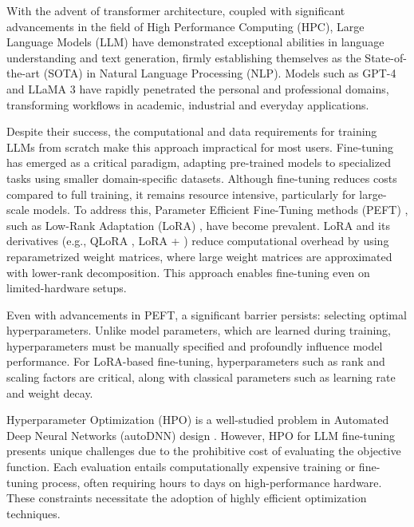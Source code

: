 \documentclass[runningheads]{llncs}
\begin{document}
With the advent of transformer architecture\cite{vaswani_attention_2017}, coupled with significant advancements in the field of High Performance Computing (HPC), Large Language Models (LLM) have demonstrated exceptional abilities in language understanding and text generation, firmly establishing themselves as the State-of-the-art (SOTA) in Natural Language Processing (NLP). Models such as GPT-4 \cite{openai_gpt-4_2024} and LLaMA 3 \cite{grattafiori_llama_2024} have rapidly penetrated the personal and professional domains, transforming workflows in academic, industrial and everyday applications.

Despite their success, the computational and data requirements for training LLMs from scratch make this approach impractical for most users. Fine-tuning has emerged as a critical paradigm, adapting pre-trained models to specialized tasks using smaller domain-specific datasets. Although fine-tuning reduces costs compared to full training, it remains resource intensive, particularly for large-scale models. To address this, Parameter Efficient Fine-Tuning methods (PEFT) \cite{han_parameter-efficient_2024}, such as Low-Rank Adaptation (LoRA) \cite{hu_lora_2021}, have become prevalent. LoRA and its derivatives (e.g., QLoRA \cite{dettmers_qlora_2023}, LoRA + \cite{hayou_lora_2024}) reduce computational overhead by using reparametrized weight matrices, where large weight matrices are approximated with lower-rank decomposition. This approach enables fine-tuning even on limited-hardware setups.

Even with advancements in PEFT, a significant barrier persists: selecting optimal hyperparameters. Unlike model parameters, which are learned during training, hyperparameters must be manually specified and profoundly influence model performance. For LoRA-based fine-tuning, hyperparameters such as rank and scaling factors are critical\cite{valipour_dylora_2023}, along with classical parameters such as learning rate and weight decay.

Hyperparameter Optimization (HPO) is a well-studied problem \cite{bischl_hyperparameter_2021,bergstra_algorithms_2011,feurer_hyperparameter_2019} in Automated Deep Neural Networks (autoDNN) design \cite{talbi_automated_2021}. However, HPO for LLM fine-tuning presents unique challenges due to the prohibitive cost of evaluating the objective function. Each evaluation entails computationally expensive training or fine-tuning process, often requiring hours to days on high-performance hardware. These constraints necessitate the adoption of highly efficient optimization techniques.
\end{document}
